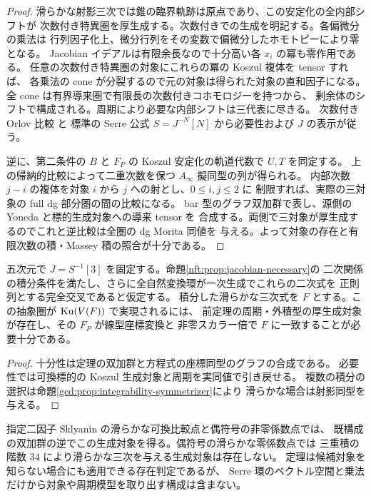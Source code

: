 \begin{proof}
滑らかな射影三次では錐の臨界軌跡は原点であり、この安定化の全内部シフトが
次数付き特異圏を厚生成する。次数付きでの生成を明記する。各偏微分の乗法は
行列因子化上、微分行列をその変数で偏微分したホモトピーにより零となる。
Jacobian イデアルは有限余長なので十分高い各 $x_i$ の冪も零作用である。
任意の次数付き特異圏の対象にこれらの冪の Koszul 複体を tensor すれば、
各乗法の cone が分裂するので元の対象は得られた対象の直和因子になる。
全 cone は有界導来圏で有限長の次数付きコホモロジーを持つから、
剰余体のシフトで構成される。周期により必要な内部シフトは三代表に尽きる。
次数付き Orlov 比較 \cite[Theorems~2.5, 3.10]{NFMOrlovSingularities} と
標準の Serre 公式 $S=J^{-N}[N]$ から必要性および $J$ の表示が従う。

逆に、第二条件の $B$ と $F_P$ の Koszul 安定化の軌道代数で $U,T$ を同定する。
上の帰納的比較によって二重次数を保つ $A_\infty$ 擬同型の列が得られる。
内部次数 $j-i$ の複体を対象 $i$ から $j$ への射とし、$0\le i,j\le2$ に
制限すれば、実際の三対象の full dg 部分圏の間の比較になる。
bar 型のグラフ双加群で表し、源側の Yoneda と標的生成対象への導来 tensor を
合成する。両側で三対象が厚生成するのでこれと逆比較は全圏の dg Morita 同値を
与える。よって対象の存在と有限次数の積・Massey 積の照合が十分である。
\end{proof}

\begin{corollary}
\label{cog:cor:serre-witness}
五次元で $J=S^{-1}[3]$ を固定する。命題\ref{nft:prop:jacobian-necessary}の
二次関係の積分条件を満たし、さらに全自然変換環が一次生成でこれらの二次式を
正則列とする完全交叉であると仮定する。
積分した滑らかな三次式を $F$ とする。この抽象圏が $\operatorname{Ku}(V(F))$ で実現されるには、
前定理の周期・外積型の厚生成対象が存在し、その $F_P$ が線型座標変換と
非零スカラー倍で $F$ に一致することが必要十分である。
\end{corollary}
\begin{proof}
十分性は定理の双加群と方程式の座標同型のグラフの合成である。
必要性では可換標的の Koszul 生成対象と周期を実同値で引き戻せる。
複数の積分の選択は命題\ref{gcd:prop:integrability-symmetrizer}により
滑らかな場合は射影同型を与える。
\end{proof}
指定二因子 Sklyanin の滑らかな可換比較点と偶符号の非零係数点では、
既構成の双加群の逆でこの生成対象を得る。偶符号の滑らかな零係数点では
三重積の階数 $34$ により滑らかな三次を与える生成対象は存在しない。
定理は候補対象を知らない場合にも適用できる存在判定であるが、
Serre 環のベクトル空間と乗法だけから対象や周期模型を取り出す構成は含まない。
